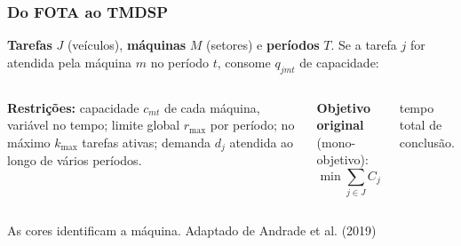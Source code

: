 \documentclass[
	11pt,
	aspectratio=169, %
]{beamer}
\begin{document}
\begin{frame}
\frametitle{Do FOTA ao TMDSP}

{\small \textbf{Tarefas} $J$ (ve\'iculos), \textbf{m\'aquinas} $M$ (setores) e
\textbf{per\'iodos} $T$. Se a tarefa $j$ for atendida pela m\'aquina $m$ no
per\'iodo $t$, consome $q_{jmt}$ de capacidade:}

\smallskip

\begin{center}
\resizebox{0.88\textwidth}{!}{}
\end{center}

\vfill

\begin{columns}[T,onlytextwidth]
{\small
\textbf{Restri\c{c}\~oes:} capacidade $c_{mt}$ de cada m\'aquina, vari\'avel no
tempo; limite global $r_{\max}$ por per\'iodo; no m\'aximo $k_{\max}$ tarefas
ativas; demanda $d_{j}$ atendida ao longo de v\'arios per\'iodos.}

{\small
\textbf{Objetivo original} (mono-objetivo):
\[
\min \sum_{j \in J} C_{j}
\]
\vspace{-0.9em}

tempo total de conclus\~ao.}
\end{columns}

\vspace{0.2em}

{\raggedleft\scriptsize\color{black!55}As cores identificam a m\'aquina.
Adaptado de Andrade et al. (2019)\par}
\end{frame}
\end{document}
